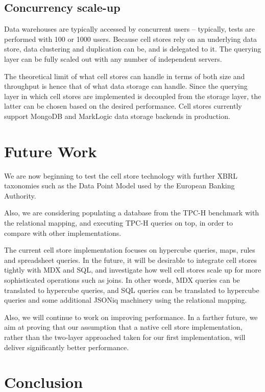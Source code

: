 \documentclass{acm_proc_article-sp}
\begin{document}
\subsection{Concurrency scale-up}

Data warehouses are typically accessed by concurrent users -- typically, tests are performed with 100 or 1000 users. Because cell stores rely on an underlying data store, data clustering and duplication can be, and is delegated to it. The querying layer can be fully scaled out with any number of independent servers.

The theoretical limit of what cell stores can handle in terms of both size and throughput is hence that of what data storage can handle. Since the querying layer in which cell stores are implemented is decoupled from the storage layer, the latter can be chosen based on the desired performance. Cell stores currently support MongoDB and MarkLogic data storage backends in production.

\section{Future Work}

We are now beginning to test the cell store technology with further XBRL taxonomies such as the Data Point Model used by the European Banking Authority.

Also, we are considering populating a database from the TPC-H benchmark with the relational mapping, and executing TPC-H queries on top, in order to compare with other implementations.

The current cell store implementation focuses on hypercube queries, maps, rules and spreadsheet queries. In the future, it will be desirable to integrate cell stores tightly with MDX and SQL, and investigate how well cell stores scale up for more sophisticated operations such as joins. In other words, MDX queries can be translated to hypercube queries, and SQL queries can be translated to hypercube queries and some additional JSONiq machinery using the relational mapping.

Also, we will continue to work on improving performance. In a farther future, we aim at proving that our assumption that a native cell store implementation, rather than the two-layer approached taken for our first implementation, will deliver significantly better performance.

\section{Conclusion}
\end{document}
